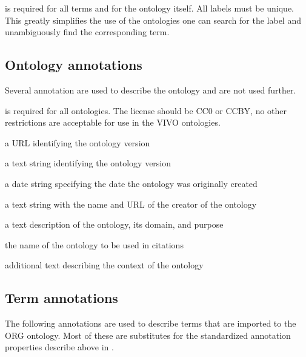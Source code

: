\documentclass[letterpaper,10pt,english]{sphinxmanual}
\begin{document}
\sphinxAtStartPar
{} is required for all terms and for the ontology itself.  All labels must be
unique.  This greatly simplifies
the use of the ontologies \textendash{} one can search for the label and unambiguously find the
corresponding term.


\subsection{Ontology annotations}
\label{\detokenize{annotation-properties:ontology-annotations}}
\sphinxAtStartPar
Several annotation are used to describe the ontology and are not used further.

\sphinxAtStartPar
{} is required for all ontologies.  The license should be CC0 or CC\sphinxhyphen{}BY, no
other restrictions are acceptable for use in the VIVO ontologies.

\sphinxAtStartPar
{} a URL identifying the ontology version

\sphinxAtStartPar
{} a text string identifying the ontology version

\sphinxAtStartPar
{} a date string specifying the date the ontology was originally created

\sphinxAtStartPar
{} a text string with the name and URL of the creator of the ontology

\sphinxAtStartPar
{} a text description of the ontology, its domain, and purpose

\sphinxAtStartPar
{} the name of the ontology to be used in citations

\sphinxAtStartPar
{} additional text describing the context of the ontology


\subsection{Term annotations}
\label{\detokenize{annotation-properties:term-annotations}}
\sphinxAtStartPar
The following annotations are used to describe terms that are imported to the ORG
ontology.  Most of these are substitutes for the standardized annotation
properties describe above in {\hyperref[\detokenize{classes:table-5}]{}}.
\end{document}
